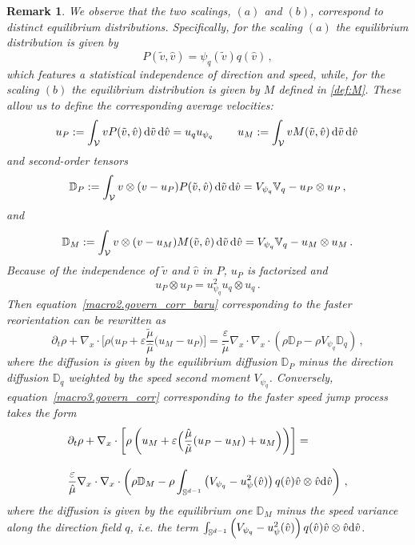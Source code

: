\documentclass[a4paper]{article}
\theoremstyle{Theorem}\newtheorem{proposition}{Proposition}[section]
\theoremstyle{Remark}\newtheorem{remark}{Remark}[section]
\theoremstyle{Theorem}\newtheorem{theorem}{Theorem}[section]
\newcommand{\hv}{\hat{v}}
\newcommand{\tv}{\tilde{v}}
\newcommand{\hmu}{\hat{\mu}}
\newcommand{\tmu}{\tilde{\mu}}
\newcommand{\intS}{\int_{\mathbb{S}^{d-1}}}
\newcommand{\intV}{\int_{\mathcal{V}}}
\begin{document}
\begin{remark}
We observe that the two scalings, $(a)$ and $(b)$, correspond to distinct equilibrium distributions. Specifically, for the scaling $(a)$ the equilibrium distribution is given by 
\[
P(\tv,\hv)= \psi_q(\tv) q(\hv)\,,
\]
which features a statistical independence of direction and speed, while, for the scaling $(b)$ the equilibrium distribution is given by $M$ defined in \eqref{def:M}. These allow us to define the corresponding average velocities:
\[
u_{P}:= \intV vP(\tv,\hv) \, {\rm d} \tv \, {\rm d} \hv = u_q u_{\psi_q}\,\qquad u_{M}:= \intV vM(\tv,\hv) \, {\rm d} \tv \, {\rm d} \hv \,
\]
and second-order tensors
\[
\mathbb{D}_{P} := \intV  v\otimes (v-u_{P})P(\tv,\hv)\,  {\rm d} \tv \, {\rm d} \hv = V_{\psi_q} \mathbb{V}_q - u_{P} \otimes u_{P} \,,
\]
and
\[
\mathbb{D}_{M} := \intV  v\otimes (v-u_{M})  M(\tv,\hv)\,  {\rm d} \tv \, {\rm d} \hv = V_{\psi_q} \mathbb{V}_q - u_{M} \otimes u_{M} \,.
\]
Because of the independence of $\tv$ and $\hv$ in $P$, $u_P$ is factorized and 
\[
u_{P}\otimes u_{P} =u_{\psi_q}^2 u_q\otimes u_q\,.
\]
Then equation~\eqref{macro2.govern_corr_baru} corresponding to the faster reorientation can be rewritten as
\begin{equation*}\label{macro2.govern_corr_baru_bis}
    \partial_t \rho +\nabla_x \cdot \Big[\rho\Big( u_{P}  +\varepsilon \dfrac{\tmu}{\hmu} \Big(u_M-u_P\Big)\Big]=\dfrac{\varepsilon}{\tmu}\nabla_x \cdot \nabla_x \cdot \left(\rho \mathbb{D}_{P}-\rho V_{\psi_q}\mathbb{D}_q\right)\,,
\end{equation*}
where the diffusion is given by the equilibrium diffusion $\mathbb{D}_{P}$ minus the direction diffusion $\mathbb{D}_q$ weighted by the speed second moment $V_{\psi_q}$.
Conversely, equation~\eqref{macro3.govern_corr}  corresponding to the faster speed jump process takes the form
\begin{equation*}\label{macro3.govern_corr_bis}
    \begin{split}
    &\partial_t \rho +\nabla_x \cdot \left[\rho \left(u_{M}+\varepsilon\Big(\dfrac{\hmu}{\tmu}(u_{P}-u_M)+u_M\Big)\right)\right]=\\[0.3cm]
    &\dfrac{\varepsilon}{\hmu}\nabla_x \cdot \nabla_x \cdot \left(\rho \mathbb{D}_{M}-\rho \intS \left(V_{\psi_q}-u_\psi^2(\hv)\right)q(\hv)\hv\otimes\hv{\rm d}\hv\right)\,,
    \end{split}
\end{equation*}
where the diffusion is given by the equilibrium one $\mathbb{D}_{M}$ minus the speed variance along the direction field $q$, i.e. the term $\intS \left(V_{\psi_q}-u_\psi^2(\hv)\right)q(\hv)\hv\otimes\hv{\rm d}\hv$.
\end{remark}
\end{document}
